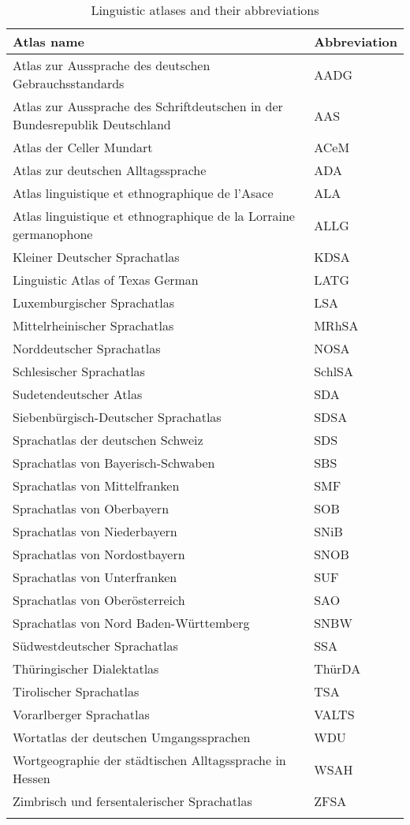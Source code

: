 \begin{table}[p]
\caption{\label{tab:1:1}Linguistic atlases and their abbreviations}
\begin{tabularx}{\textwidth}{Ql}
\lsptoprule
Atlas name & Abbreviation\\\midrule
Atlas zur Aussprache des deutschen Gebrauchsstandards & AADG\\
Atlas zur Aussprache des Schriftdeutschen in der Bundesrepublik Deutschland & AAS\\
Atlas der Celler Mundart & ACeM\\
Atlas zur deutschen Alltagssprache & ADA\\
Atlas linguistique et ethnographique de l’Asace & ALA\\
Atlas linguistique et ethnographique de la Lorraine germanophone & ALLG\\
Kleiner Deutscher Sprachatlas & KDSA\\
Linguistic Atlas of Texas German & LATG\\
Luxemburgischer Sprachatlas & LSA\\
Mittelrheinischer Sprachatlas & MRhSA\\
Norddeutscher Sprachatlas & NOSA\\
Schlesischer Sprachatlas & SchlSA\\
Sudetendeutscher Atlas & SDA\\
Siebenbürgisch-Deutscher Sprachatlas & SDSA\\
Sprachatlas der deutschen Schweiz & SDS\\
Sprachatlas von Bayerisch-Schwaben & SBS\\
Sprachatlas von Mittelfranken & SMF\\
Sprachatlas von Oberbayern & SOB\\
Sprachatlas von Niederbayern & SNiB\\
Sprachatlas von Nordostbayern & SNOB\\
Sprachatlas von Unterfranken & SUF\\
Sprachatlas von Oberösterreich & SAO\\
Sprachatlas von Nord Baden-Württemberg & SNBW\\
Südwestdeutscher Sprachatlas & SSA\\
Thüringischer Dialektatlas & ThürDA\\
Tirolischer Sprachatlas & TSA\\
Vorarlberger Sprachatlas & VALTS\\
Wortatlas der deutschen Umgangssprachen & WDU\\
Wortgeographie der städtischen Alltagssprache in Hessen & WSAH\\
Zimbrisch und fersentalerischer Sprachatlas & ZFSA\\
\lspbottomrule
\end{tabularx}
\end{table}

